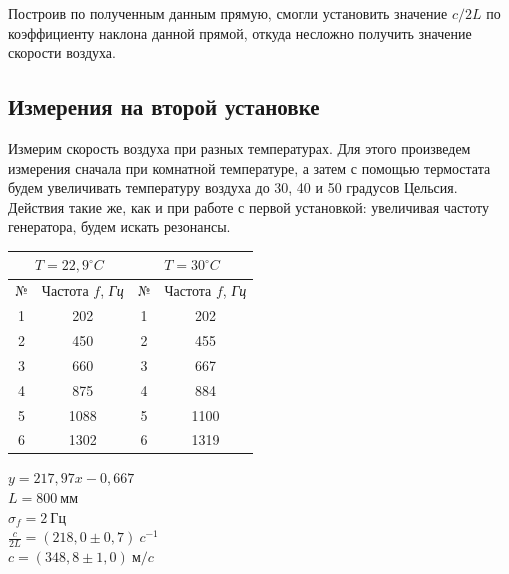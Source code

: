 \documentclass[12pt]{article}
\begin{document}
	Построив по полученным данным прямую, смогли установить значение $c/2L$ по коэффициенту наклона данной прямой, откуда несложно получить значение скорости воздуха.
	
	\subsection*{Измерения на второй установке}
	
	Измерим скорость воздуха при разных температурах. Для этого произведем измерения сначала при комнатной температуре, а затем с помощью термостата будем увеличивать температуру воздуха до 30, 40 и 50 градусов Цельсия. Действия такие же, как и при работе с первой установкой: увеличивая частоту генератора, будем искать резонансы.
	\begin{center}
	\begin{tabular}{|c|c|c|c|}
		\hline 
		\multicolumn{2}{|c|}{$T=22,9^{\circ} C$}&\multicolumn{2}{|c|}{$T=30^{\circ} C$}\\ 
		\hline 
		№ & Частота $f$, \textit{Гц} & № & Частота $f$, \textit{Гц}\\
		\hline 
		1&202 &1 &202 \\
		\hline 
		2&450 &2 & 455 \\ 
		\hline 
		3& 660&3 & 667 \\ 
		\hline 
		4&875 &4 & 884 \\ 
		\hline 
		5&1088 &5 & 1100 \\ 
		\hline 
		6&1302 &6 & 1319 \\ 
		\hline 
	\end{tabular}
\end{center}

\begin{minipage}{0.6\textwidth}
	\centering{}
\end{minipage}
\vspace{0.05\textwidth}
\begin{minipage}{0.25\textwidth}
	\centering
	$y = 217,97x - 0,667$\\
	$L = 800\ \textit{мм}$\\
	$\sigma_f = 2\ \textit{Гц}$\\
	$\frac{c}{2L} = (218,0 \pm 0,7)\  c^{-1}$\\
	$ c = (348,8 \pm 1,0)\ \textit{м/c}$\\
	
	
\end{minipage}
\end{document}
